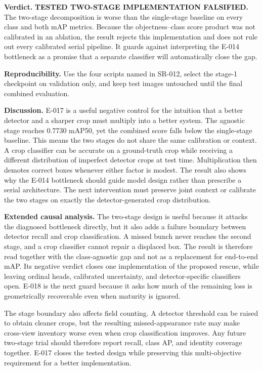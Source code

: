 \documentclass[preprint,12pt]{elsarticle}
\begin{document}
\textbf{Verdict.} \textbf{TESTED TWO-STAGE IMPLEMENTATION FALSIFIED.} The
two-stage decomposition is worse than the single-stage baseline on every class
and both mAP metrics. Because the objectness--class score product was not
calibrated in an ablation, the result rejects this implementation and does not
rule out every calibrated serial pipeline. It guards against interpreting the
E-014 bottleneck as a promise that a separate classifier will automatically
close the gap.

\textbf{Reproducibility.} Use the four scripts named in SR-012, select the
stage-1 checkpoint on validation only, and keep test images untouched until
the final combined evaluation.

\textbf{Discussion.} E-017 is a useful negative control for the intuition
that a better detector and a sharper crop must multiply into a better system.
The agnostic stage reaches 0.7730 mAP50, yet the combined score falls below
the single-stage baseline. This means the two stages do not share the same
calibration or context. A crop classifier can be accurate on a ground-truth
crop while receiving a different distribution of imperfect detector crops at
test time. Multiplication then demotes correct boxes whenever either factor
is modest. The result also shows why the E-014 bottleneck should guide model
design rather than prescribe a serial architecture. The next intervention
must preserve joint context or calibrate the two stages on exactly the
detector-generated crop distribution.

\textbf{Extended causal analysis.} The two-stage design is useful because it
attacks the diagnosed bottleneck directly, but it also adds a failure boundary
between detector recall and crop classification. A missed bunch never reaches
the second stage, and a crop classifier cannot repair a displaced box. The
result is therefore read together with the class-agnostic gap and not as a
replacement for end-to-end mAP. Its negative verdict closes one implementation
of the proposed rescue, while leaving ordinal heads, calibrated uncertainty,
and detector-specific classifiers open. E-018 is the next guard because it
asks how much of the remaining loss is geometrically recoverable even when
maturity is ignored.

The stage boundary also affects field counting. A detector threshold can be
raised to obtain cleaner crops, but the resulting missed-appearance rate may
make cross-view inventory worse even when crop classification improves. Any
future two-stage trial should therefore report recall, class AP, and identity
coverage together. E-017 closes the tested design while preserving this
multi-objective requirement for a better implementation.
\end{document}
